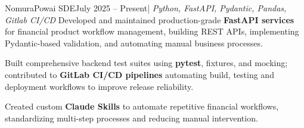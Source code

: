 \resumeSubheading
{Nomura}{Powai}
{SDE}{July 2025 -- Present}{| \textit{Python, FastAPI, Pydantic, Pandas, Gitlab CI/CD}}
\resumeItemListStart    
{}
{Developed and maintained production-grade \textbf{FastAPI services} for financial product workflow management, building REST APIs, implementing Pydantic-based validation, and automating manual business processes.}

{Built comprehensive backend test suites using \textbf{pytest}, fixtures, and mocking; contributed to \textbf{GitLab CI/CD pipelines} automating build, testing and deployment workflows to improve release reliability.}

{Created custom \textbf{Claude Skills} to automate repetitive financial workflows, standardizing multi-step processes and reducing manual intervention.}